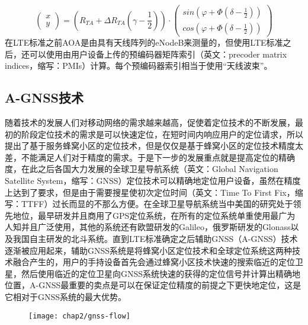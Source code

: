 \begin{enumerate}
{\begin{equation}
            \label{eq:aoa-eq}
            \left(\begin{array}{cccc}
                x \\
                y
            \end{array}\right)=(R_{TA}+\Delta R_{TA}(\gamma - \frac{1}{2}))\cdot 
            \left(\begin{array}{cccc}
                sin(\varphi+\Phi(\delta-\frac{1}{2})) \\
                cos(\varphi+\Phi(\delta-\frac{1}{2}))
            \end{array}\right)
        \end{equation}}  
        在LTE标准之前AOA是由具有天线阵列的eNodeB来测量的，但使用LTE标准之后，还可以使用由用户设备上传的预编码器矩阵索引（英文：precoder matrix indices，缩写：PMIs）计算。每个预编码器索引相当于使用“天线波束”。
\end{enumerate}

\subsection{A-GNSS技术}
随着技术的发展人们对移动网络的需求越来越高，促使着定位技术的不断发展，最初的阶段定位技术的需求是可以快速定位，在短时间内响应用户的定位请求，所以提出了基于服务蜂窝小区的定位技术，但是仅仅是基于蜂窝小区的定位技术精度太差，不能满足人们对于精度的需求。于是下一步的发展重点就是提高定位的精确度，在此之后各国大力发展的全球卫星导航系统（英文：Global Navigation Satellite System，缩写：GNSS）定位技术可以精确地定位用户设备，虽然在精度上达到了要求，但是由于需要搜星使初次定位时间（英文：Time To First Fix，缩写：TTFF）过长而显的不那么方便。在全球卫星导航系统当中美国的研究处于领先地位，最早研发并且商用了GPS定位系统，在所有的定位系统单重使用最广为人知并且广泛使用，其他的系统还有欧盟研发的Galileo，俄罗斯研发的Glonass以及我国自主研发的北斗系统。直到LTE标准确定之后辅助GNSS（A-GNSS）技术逐渐被应用起来，辅助GNSS系统是将蜂窝小区定位技术和全球定位系统这两种技术融合产生的，用户的手持设备首先会通过蜂窝小区技术快速的搜索临近的定位卫星，然后使用临近的定位卫星向GNSS系统快速的获得的定位信号并计算出精确地位置，A-GNSS最重要的卖点是可以在保证定位精度的前提之下更快地定位，这是它相对于GNSS系统的最大优势。

\begin{figure}[!htp]
    \centering
    \texttt{[image: chap2/gnss-flow]}
\end{figure}

